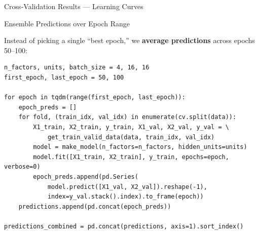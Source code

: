 \documentclass[aspectratio=169, 11pt]{beamer}
\begin{document}
\begin{frame}{Cross-Validation Results --- Learning Curves}

\centering
{}

\end{frame}
%
%
\begin{frame}[fragile]{Ensemble Predictions over Epoch Range}

Instead of picking a single ``best epoch,'' we \textbf{average predictions} across epochs 50--100:

\begin{lstlisting}
n_factors, units, batch_size = 4, 16, 16
first_epoch, last_epoch = 50, 100

for epoch in tqdm(range(first_epoch, last_epoch)):
    epoch_preds = []
    for fold, (train_idx, val_idx) in enumerate(cv.split(data)):
        X1_train, X2_train, y_train, X1_val, X2_val, y_val = \
            get_train_valid_data(data, train_idx, val_idx)
        model = make_model(n_factors=n_factors, hidden_units=units)
        model.fit([X1_train, X2_train], y_train, epochs=epoch, verbose=0)
        epoch_preds.append(pd.Series(
            model.predict([X1_val, X2_val]).reshape(-1),
            index=y_val.stack().index).to_frame(epoch))
    predictions.append(pd.concat(epoch_preds))

predictions_combined = pd.concat(predictions, axis=1).sort_index()
\end{lstlisting}
\end{frame}
\end{document}

